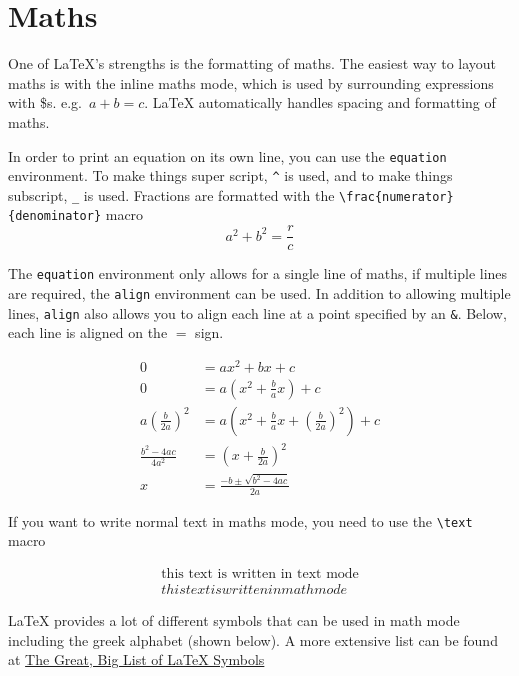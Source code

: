 \documentclass{article}
\begin{document}
\section{Maths}

One of \LaTeX{}'s strengths is the formatting of maths. The easiest way to layout maths is with the inline maths mode, which is used by surrounding expressions with \$s. e.g.\ $a + b = c$. \LaTeX{} automatically handles spacing and formatting of maths.

In order to print an equation on its own line, you can use the \lstinline{equation} environment. To make things super script, \lstinline{^} is used, and to make things subscript, \lstinline{_} is used. Fractions are formatted with the \lstinline|\frac{numerator}{denominator}| macro
\begin{equation}
    a^2 + b^2  = \frac{r}{c}
\end{equation}

The \lstinline{equation} environment only allows for a single line of maths, if multiple lines are required, the \lstinline{align} environment can be used. In addition to allowing multiple lines, \lstinline{align} also allows you to align each line at a point specified by an \lstinline{&}. Below, each line is aligned on the $=$ sign.

\begin{align}
  0 &= ax^2 + bx + c \\
  0 &= a(x^2 + \frac{b}{a}x) + c \\
  a(\frac{b}{2a})^2 &= a(x^2 + \frac{b}{a}x + (\frac{b}{2a})^2) + c \\
  \frac{b^2-4ac}{4a^2} &= (x +\frac{b}{2a})^2 \\
  x &= \frac{-b \pm \sqrt{b^2 - 4ac}}{2a}
\end{align}

If you want to write normal text in maths mode, you need to use the \lstinline{\text} macro

\begin{align}
  \text{this text is written in text mode} \\
  this text is written in math mode
\end{align}

\LaTeX{} provides a lot of different  symbols that can be  used in math mode including the greek alphabet (shown below). A more extensive list can be found at \href{https://www.rpi.edu/dept/arc/training/latex/LaTeX_symbols.pdf}{The Great, Big List of \LaTeX{} Symbols} \cite{carlisle_great_2001}
\end{document}
